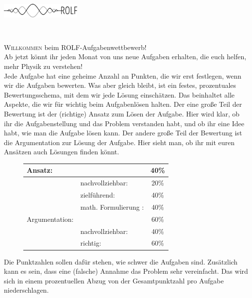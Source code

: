 \documentclass[a4paper]{article}
\begin{document}
	\vspace*{-2cm}
	\parbox{4cm}{\vspace{0.4cm}\includegraphics[width=4cm]{../images/logo_scaled.pdf}}
	\parbox{10.6cm}{ \\  \vspace*{-.5cm} }
\thispagestyle{empty}	
\vspace{1cm}
\noindent
\newline
\textsc{Willkommen} beim ROLF-Aufgabenwettbewerb!\\
Ab jetzt könnt ihr jeden Monat von uns neue Aufgaben erhalten, die euch helfen, mehr Physik zu verstehen!\\ 
Jede Aufgabe hat eine geheime Anzahl an Punkten, die wir erst festlegen, wenn wir die Aufgaben bewerten. Was aber gleich bleibt, ist ein festes, prozentuales Bewertungsschema, mit dem wir jede Lösung einschätzen. Das beinhaltet alle Aspekte, die wir für wichtig beim Aufgabenlösen halten. Der eine große Teil der Bewertung ist der (richtige) Ansatz zum Lösen der Aufgabe. Hier wird klar, ob ihr die Aufgabenstellung und das Problem verstanden habt, und ob ihr eine Idee habt, wie man die Aufgabe lösen kann. Der andere große Teil der Bewertung ist die Argumentation zur Lösung der Aufgabe. Hier sieht man, ob ihr mit euren Ansätzen auch Lösungen finden könnt. 
\newline
\begin{figure}[h]
	\centering
\begin{tabular}{l| l c}
	Ansatz: & & 40\%\\\hline
	& nachvollziehbar:&20\%\\
	&zielführend:&40\%\\
	&math. Formulierung :& 40\%\\\hline\hline
	Argumentation:& &60\% \\\hline
	&nachvollziehbar:&40\%\\
	&richtig:&60\%\\\hline
	
\end{tabular}
\end{figure}
Die Punktzahlen sollen dafür stehen, wie schwer die Aufgaben sind. Zusätzlich kann es sein, dass eine (falsche) Annahme das Problem sehr vereinfacht. Das wird sich in einem prozentuellen Abzug von der Gesamtpunktzahl pro Aufgabe niederschlagen.\\
\end{document}
